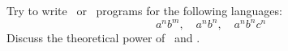 Try to write \lex\ or \yacc\ programs for the following languages:
\[ a^nb^m, \quad a^nb^n, \quad a^nb^nc^n \]
Discuss the theoretical power of \lex\ and \yacc.
